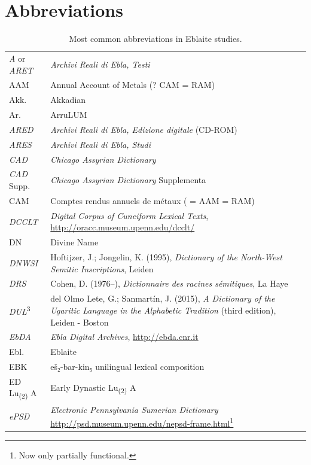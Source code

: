 \documentclass[
]{book}
\begin{document}
\hypertarget{abbreviations}{%
\section{Abbreviations}\label{abbreviations}}

\begin{longtable}[]{@{}
  >{\raggedright\arraybackslash}p{}
  >{\raggedright\arraybackslash}p{}@{}}
\caption{\label{tab:abbreviation} Most common abbreviations in Eblaite studies.}\tabularnewline
\toprule\noalign{}
\endfirsthead
\endhead
\bottomrule\noalign{}
\endlastfoot
\emph{A} or \emph{ARET} & \emph{Archivi Reali di Ebla, Testi} \\
AAM & Annual Account of Metals (? CAM = RAM) \\
Akk. & Akkadian \\
Ar. & ArruLUM \\
\emph{ARED} & \emph{Archivi Reali di Ebla, Edizione digitale} (CD-ROM) \\
\emph{ARES} & \emph{Archivi Reali di Ebla, Studi} \\
\emph{CAD} & \emph{Chicago Assyrian Dictionary} \\
\emph{CAD} Supp. & \emph{Chicago Assyrian Dictionary} Supplementa \\
CAM & Comptes rendus annuels de métaux ( = AAM = RAM) \\
\emph{DCCLT} & \emph{Digital Corpus of Cuneiform Lexical Texts}, \url{http://oracc.museum.upenn.edu/dcclt/} \\
DN & Divine Name \\
\emph{DNWSI} & Hoftijzer, J.; Jongelin, K. (1995), \emph{Dictionary of the North-West Semitic Inscriptions}, Leiden \\
\emph{DRS} & Cohen, D. (1976--), \emph{Dictionnaire des racines sémitiques}, La Haye \\
\emph{DUL}\textsuperscript{3} & del Olmo Lete, G.; Sanmartín, J. (2015), \emph{A Dictionary of the Ugaritic Language in the Alphabetic Tradition} (third edition), Leiden - Boston \\
\emph{EbDA} & \emph{Ebla Digital Archives}, \url{http://ebda.cnr.it} \\
Ebl. & Eblaite \\
EBK & eš₂-bar-kin₅ unilingual lexical composition \\
ED Lu\textsubscript{(2)} A & Early Dynastic Lu\textsubscript{(2)} A \\
\emph{ePSD} & \emph{Electronic Pennsylvania Sumerian Dictionary} \url{http://psd.museum.upenn.edu/nepsd-frame.html}\footnote{Now only partially functional.} \\

\end{longtable}
\end{document}
